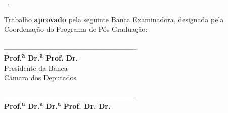 \documentclass[
	12pt,				%
        openright, %
        twoside,   %
	a4paper,			%
	chapter=TITLE,		%
	english,			%
	french,				%
	spanish,			%
	brazil,				%
    ]{abntex2}
\providecommand{\imprimirlinhadepesquisa}{}
\providecommand{\imprimirmembroA}{}
\providecommand{\imprimirfuncaomembroA}{}
\providecommand{\imprimirfiliacaomembroA}{}
\begin{document}
\begin{folhadeaprovacao}
\begin{minipage}{15.9cm}
{\vspace{0.0cm}

 \begin{flushright}
      \begin{minipage}{.5\textwidth}
      	 \SingleSpacing
         \imprimirpreambulo\ \textbf{\imprimirlinhadepesquisa}.
         \par\bigskip
      \end{minipage}
      \end{flushright}

\vspace{0.6cm}

Trabalho \textbf{aprovado} pela seguinte Banca Examinadora, designada pela Coordenação do Programa de Pós-Graduação:

\vspace{1.5cm}

\begin{flushleft}
\begin{minipage}{0.49\textwidth}
\begin{center}
\_\_\_\_\_\_\_\_\_\_\_\_\_\_\_\_\_\_\_\_\_\_\_\_\_\\
{\small \textbf{
{Prof.\textsuperscript{a} Dr.\textsuperscript{a} \imprimirorientador}
{Prof. Dr. \imprimirorientador}}}\\
{\footnotesize Presidente da Banca\\\vspace{-1mm}Câmara dos Deputados}

\vspace{1.9cm}

\_\_\_\_\_\_\_\_\_\_\_\_\_\_\_\_\_\_\_\_\_\_\_\_\_\\
{\small \textbf{
        {
        {\textbf{Prof.\textsuperscript{a} Dr.\textsuperscript{a} \imprimirmembroA}}
        {\textbf{Dr.\textsuperscript{a} \imprimirmembroA}}}
            {
            {\textbf{Prof. Dr. \imprimirmembroA}}
            {\textbf{Dr. \imprimirmembroA}}}}}\\
{\footnotesize \imprimirfuncaomembroA\\\vspace{-1mm}\imprimirfiliacaomembroA}
\end{center}
\end{minipage}
\end{flushleft}

}
\end{minipage}
\end{folhadeaprovacao}
\end{document}
